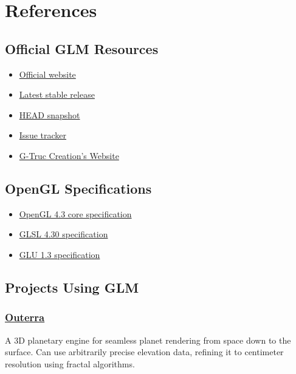 \documentclass{scrartcl}
\numberwithin{figure}{subsection}
\begin{document}
\newpage{}

\section{References}

\subsection{Official GLM Resources}

\begin{itemize}
  \item \href{http://glm.g-truc.net}{Official website}
  \item \href{https://github.com/g-truc/glm/releases/tag/0.9.7.2}{Latest stable release}
  \item \href{https://github.com/g-truc/glm/archive/master.zip}{HEAD snapshot}
  \item \href{https://github.com/g-truc/glm/issues}{Issue tracker}
  \item \href{http://www.g-truc.net}{G-Truc Creation's Website}
\end{itemize}

\subsection{OpenGL Specifications}

\begin{itemize}
  \item \href{http://www.opengl.org/registry/doc/glspec43.core.20120806.withchanges.pdf}{OpenGL 4.3 core specification}
  \item \href{http://www.opengl.org/registry/doc/GLSLangSpec.4.30.7.diff.pdf}{GLSL 4.30 specification}
  \item \href{http://www.opengl.org/documentation/specs/glu/glu1_3.pdf}{GLU 1.3 specification}
\end{itemize}

\subsection{Projects Using GLM}

\subsubsection{\href{http://outerra.com/}{Outerra}}

A 3D planetary engine for seamless planet rendering from space down to the surface. Can use arbitrarily precise elevation data, refining it to centimeter resolution using fractal algorithms.
\end{document}
